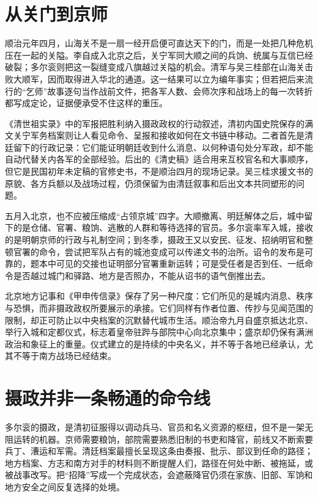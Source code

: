 \section{从关门到京师}

顺治元年四月，山海关不是一扇一经开启便可直达天下的门，而是一处把几种危机压在一起的关隘。李自成入北京之后，关宁军同大顺之间的兵饷、统属与互信已经破裂；多尔衮则把这一裂缝变成八旗越过关隘的机会。清军与吴三桂部在山海关击败大顺军，因而取得进入华北的通道。这一结果可以立为编年事实；但若把后来流行的“乞师”故事逐句当作战前文件，把各军人数、会师次序和战场上的每一次转折都写成定论，证据便承受不住这样的重压。

《清世祖实录》中的军报把胜利纳入摄政政权的行动叙述，清初内国史院保存的满文关宁军务档案则让人看见命令、呈报和接收如何在文书链中移动。二者首先是清廷留下的行政记录：它们能证明朝廷收到什么消息、以何种语句处分军政，却不能自动代替关内各军的全部经验。后出的《清史稿》适合用来互校官名和大事顺序，但它是民国初年未定稿的官修史书，不是顺治四月的现场记录。吴三桂求援文书的原貌、各方兵额以及战场过程，仍须保留为由清廷叙事和后出文本共同塑形的问题。

五月入北京，也不应被压缩成“占领京城”四字。大顺撤离、明廷解体之后，城中留下的是仓储、官署、粮饷、逃散的人群和等待选择的官员。多尔衮率军入城，接收的是明朝京师的行政与礼制空间；到冬季，摄政王又以安民、征发、招纳明官和整顿官署的命令，尝试把军队占有的城池变成可以传递文书的治所。诏令的发布是可靠的，题本中可见的交接也证明部分官署重新运转；可是受任者是否到任、一纸命令是否越过城门和驿路、地方是否照办，不能从诏书的语气倒推出去。

北京地方记事和《甲申传信录》保存了另一种尺度：它们所见的是城内消息、秩序与恐惧，而非摄政政权所要展示的承接。它们同样有作者位置、传抄与见闻范围的限制，却正可防止以中央档案的沉默替代城市生活。顺治帝九月自盛京抵达北京、举行入城和定都仪式，标志着皇帝驻跸与部院中心向北京集中；盛京却仍保有满洲政治和象征上的重量。仪式建立的是持续的中央名义，并不等于各地已经承认，尤其不等于南方战场已经结束。

\section{摄政并非一条畅通的命令线}

多尔衮的摄政，是清初征服得以调动兵马、官员和名义资源的枢纽，但不是一架无阻运转的机器。京师需要粮饷，部院需要熟悉旧制的书吏和降官，前线又不断索要兵丁、漕运和军需。清廷档案最擅长呈现这条由奏报、批示、部议到任命的路径；地方档案、方志和南方对手的材料则不断提醒人们，路径在何处中断、被拖延，或被战事改写。把“招降”写成一个完成状态，会遮蔽降官仍须在家族、旧部、军饷和地方安全之间反复选择的处境。

